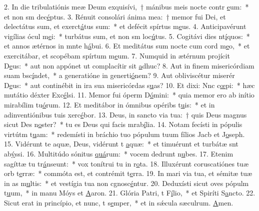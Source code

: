 2. In die tribulatiónis meæ Deum exquisívi,~† mánibus meis nocte contr \uline{e}um:~* et non sm dec\uline{é}ptus.
3. Rénuit consolári ánima mea:~† memor fui Dei, et delectátus sum, et exerct\uline{á}tus sum:~* et defécit spírtus m\uline{e}us.
4. Anticipavérunt vigílias ócul m\uline{e}i:~* turbátus sum, et non sm loc\uline{ú}tus.
5. Cogitávi dies nt\uline{í}quos:~* et annos ætérnos in mnte h\uline{á}bui.
6. Et meditátus sum nocte cum cord m\uline{e}o,~* et exercitábar, et scopébam spírtum m\uline{e}um.
7. Numquid in ætérnum projícit D\uline{e}us:~* aut non appónet ut complacítir sit \uline{a}dhuc?
8. Aut in finem misericórdiam suam bsc\uline{í}ndet,~* a generatióne in generti\uline{ó}nem?
9. Aut obliviscétur miserér D\uline{e}us:~* aut continébit in ira sua misericórdas s\uline{u}as?
10. Et dixi: Nnc c\uline{œ}pi:~* hæc mutátio déxter Exc\uline{é}lsi.
11. Memor fui óperm D\uline{ó}mini:~* quia memor ero ab inítio mirabílim tu\uline{ó}rum.
12. Et meditábor in ómnibus opéribs t\uline{u}is:~* et in adinventiónibus tuis xerc\uline{é}bor.
13. Deus, in sancto via tua:~† quis Deus magnus sicut Des n\uline{o}ster?~* tu es Deus qui facis mrab\uline{í}lia.
14. Notam fecísti in pópulis virtútm t\uline{u}am:~* redemísti in bráchio tuo pópulum tuum fílios Jacb et J\uline{o}seph.
15. Vidérunt te aquæ, Deus, vidérunt t \uline{a}quæ:~* et timuérunt et turbátæ snt ab\uline{ý}ssi.
16. Multitúdo sónitus \uline{quá}rum:~* vocem dedrunt n\uline{u}bes.
17. Etenim sagíttæ tu tr\uline{á}nseunt:~* vox tonítrui tu in r\uline{o}ta.
18. Illuxérunt coruscatiónes tuæ orb t\uline{e}rræ:~* commóta est, et contrémit t\uline{e}rra.
19. In mari via tua, et sémitæ tuæ in as m\uline{u}ltis:~* et vestígia tua non cgnosc\uline{é}ntur.
20. Deduxísti sicut oves pópulm t\uline{u}um,~* in manu Móys et \uline{A}aron.
21. Glória Patri, t F\uline{í}lio,~* et Spiríti S\uline{a}ncto.
22. Sicut erat in princípio, et nunc, t s\uline{e}mper,~* et in sǽcula sæculrum. \uline{A}men.
